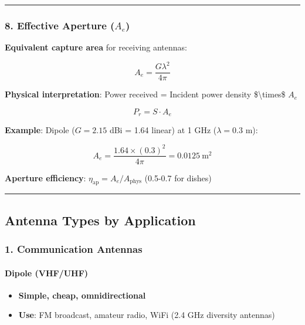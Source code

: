 \begin{center}\rule{0.5\linewidth}{0.5pt}\end{center}

\subsubsection{\texorpdfstring{8. Effective Aperture
(\(A_e\))}{8. Effective Aperture (A\_e)}}\label{effective-aperture-a_e}

\textbf{Equivalent capture area} for receiving antennas:

\[
A_e = \frac{G \lambda^2}{4\pi}
\]

\textbf{Physical interpretation}: Power received = Incident power
density \$\textbackslash times\$ \(A_e\)

\[
P_r = S \cdot A_e
\]

\textbf{Example}: Dipole (\(G = 2.15\) dBi = 1.64 linear) at 1 GHz
(\(\lambda = 0.3\) m):

\[
A_e = \frac{1.64 \times (0.3)^2}{4\pi} = 0.0125\ \text{m}^2
\]

\textbf{Aperture efficiency}:
\(\eta_{\text{ap}} = A_e / A_{\text{phys}}\) (0.5-0.7 for dishes)

\begin{center}\rule{0.5\linewidth}{0.5pt}\end{center}

\subsection{Antenna Types by
Application}\label{antenna-types-by-application}

\subsubsection{1. Communication Antennas}\label{communication-antennas}

\paragraph{Dipole (VHF/UHF)}\label{dipole-vhfuhf}

\begin{itemize}
\tightlist
\item
  \textbf{Simple, cheap, omnidirectional}
\item
  \textbf{Use}: FM broadcast, amateur radio, WiFi (2.4 GHz diversity
  antennas)
\end{itemize}

